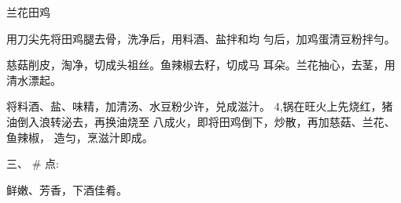\begin{recipe}{兰花田鸡}

\ingredients




\cooking

\step 	用刀尖先将田鸡腿去骨，洗净后，用料酒、盐拌和均 勻后，加鸡蛋清豆粉拌勻。

\step 	慈菇削皮，淘净，切成头祖丝。鱼辣椒去籽，切成马 耳朵。兰花抽心，去茎，用清水漂起。

将料酒、盐、味精，加清汤、水豆粉少许，兑成滋汁。 4,锅在旺火上先烧红，猪油倒入浪转泌去，再换油烧至 八成火，即将田鸡倒下，炒散，再加慈菇、兰花、鱼辣椒， 造匀，烹滋汁即成。

三、 #	点:

鲜嫩、芳香，下酒佳肴。

\end{recipe}

